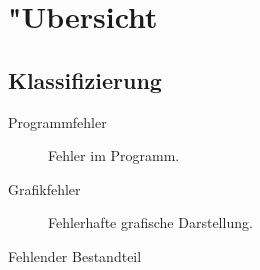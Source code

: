 %



\section{{"U}bersicht}
\label{Kapitel:Programmfehler:Uebersicht}








\subsection{Klassifizierung}
\label{Abschnitt:Programmfehler:Uebersicht:Klassifizierung}



\begin{description}

	\item[Programmfehler] Fehler im Programm.
	
	\item[Grafikfehler] Fehlerhafte grafische Darstellung.
	
	\item[Fehlender Bestandteil]
	

\end{description}


